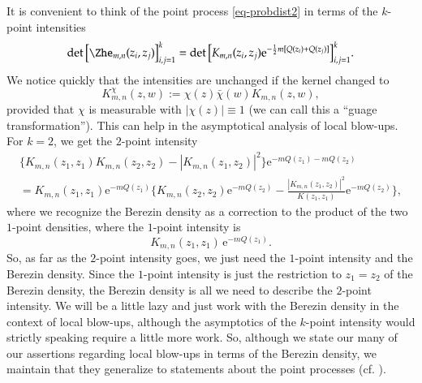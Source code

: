 \documentclass{birkart}
\theoremstyle{definition}
\theoremstyle{remark}
\numberwithin{equation}{section}
\numberwithin{figure}{section}
\newcommand{\e}{\mathrm e}
\newcommand{\1}{{\mathbf 1}}
\begin{document}
It is convenient to think of the point process \eqref{eq-probdist2} in terms
of the $k$-point intensities
\[
\det\big[\Zhe_{m,n}(z_i,z_j)\big]_{i,j=1}^{k}
=\det\big[K_{m,n}(z_i,z_j)
\e^{-\frac{1}{2}m[Q(z_i)+Q(z_j)]}\big]_{i,j=1}^{k}.
\]
We notice quickly that the intensities are unchanged if the kernel changed
to 
\[
K^\chi_{m,n}(z,w):=\chi(z)\bar\chi(w)K_{m,n}(z,w),
\]
provided that $\chi$ is measurable with $|\chi(z)|\equiv1$ 
(we can call this a ``guage transformation''). This can help in the 
asymptotical analysis of local blow-ups. For $k=2$, we get the $2$-point 
intensity
\begin{multline*}
\big\{K_{m,n}(z_1,z_1)K_{m,n}(z_2,z_2)-|K_{m,n}(z_1,z_2)|^2\big\}
\e^{-mQ(z_1)-mQ(z_2)}
\\
=K_{m,n}(z_1,z_1)\e^{-mQ(z_1)}\bigg\{K_{m,n}(z_2,z_2)\e^{-mQ(z_2)}
-\frac{|K_{m,n}(z_1,z_2)|^2}{K(z_1,z_1)}\e^{-mQ(z_2)}\bigg\},
\end{multline*}
where we recognize the Berezin density as a correction to the product of
the two $1$-point densities, where the $1$-point intensity is 
\[
K_{m,n}(z_1,z_1)\,\e^{-mQ(z_1)}.
\]
So, as far as the $2$-point intensity goes, we just need the $1$-point 
intensity and the Berezin density. Since the $1$-point intensity is just the
restriction to $z_1=z_2$ of the Berezin density, the Berezin density is all
we need to describe the $2$-point intensity. We will be a little lazy
and just work with the Berezin density in the context of local blow-ups, 
although the asymptotics of the $k$-point intensity would strictly speaking
require a little more work. So, although we state our many of our assertions 
regarding local blow-ups in terms of the Berezin density, we maintain that 
they generalize to statements about the point processes (cf. \cite{ahm2}).
\medskip
\end{document}
